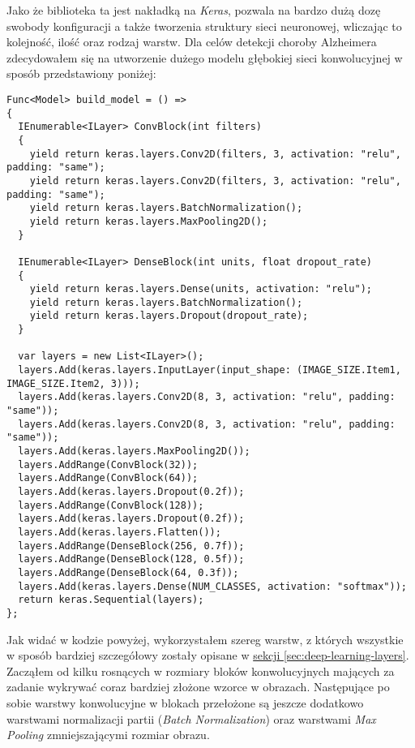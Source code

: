 Jako że biblioteka ta jest nakładką na \emph{Keras}, pozwala na bardzo dużą dozę swobody konfiguracji a także tworzenia struktury sieci neuronowej, wliczając to kolejność, ilość oraz rodzaj warstw.
Dla celów detekcji choroby Alzheimera zdecydowałem się na utworzenie dużego modelu głębokiej sieci konwolucyjnej w sposób przedstawiony poniżej:

\begin{lstlisting}[language={[Sharp]C}]
Func<Model> build_model = () =>
{
  IEnumerable<ILayer> ConvBlock(int filters)
  {
    yield return keras.layers.Conv2D(filters, 3, activation: "relu", padding: "same");
    yield return keras.layers.Conv2D(filters, 3, activation: "relu", padding: "same");
    yield return keras.layers.BatchNormalization();
    yield return keras.layers.MaxPooling2D();
  }

  IEnumerable<ILayer> DenseBlock(int units, float dropout_rate)
  {
    yield return keras.layers.Dense(units, activation: "relu");
    yield return keras.layers.BatchNormalization();
    yield return keras.layers.Dropout(dropout_rate);
  }

  var layers = new List<ILayer>();
  layers.Add(keras.layers.InputLayer(input_shape: (IMAGE_SIZE.Item1, IMAGE_SIZE.Item2, 3)));
  layers.Add(keras.layers.Conv2D(8, 3, activation: "relu", padding: "same"));
  layers.Add(keras.layers.Conv2D(8, 3, activation: "relu", padding: "same"));
  layers.Add(keras.layers.MaxPooling2D());
  layers.AddRange(ConvBlock(32));
  layers.AddRange(ConvBlock(64));
  layers.Add(keras.layers.Dropout(0.2f));
  layers.AddRange(ConvBlock(128));
  layers.Add(keras.layers.Dropout(0.2f));
  layers.Add(keras.layers.Flatten());
  layers.AddRange(DenseBlock(256, 0.7f));
  layers.AddRange(DenseBlock(128, 0.5f));
  layers.AddRange(DenseBlock(64, 0.3f));
  layers.Add(keras.layers.Dense(NUM_CLASSES, activation: "softmax"));
  return keras.Sequential(layers);
};
\end{lstlisting}

Jak widać w kodzie powyżej, wykorzystałem szereg warstw, z których wszystkie w sposób bardziej szczegółowy zostały opisane w \hyperref[sec:deep-learning-layers]{sekcji \ref*{sec:deep-learning-layers}}.
Zacząłem od kilku rosnących w rozmiary bloków konwolucyjnych mających za zadanie wykrywać coraz bardziej złożone wzorce w obrazach.
Następujące po sobie warstwy konwolucyjne w blokach przełożone są jeszcze dodatkowo warstwami normalizacji partii (\emph{Batch Normalization}) oraz warstwami \emph{Max Pooling} zmniejszającymi rozmiar obrazu.

